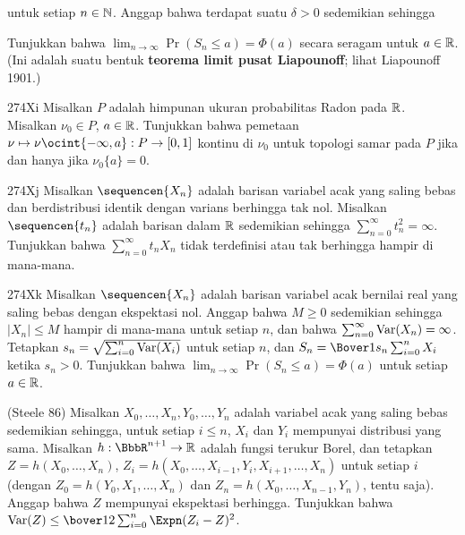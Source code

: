 {

\noindent untuk setiap $n\in\Bbb N$. Anggap bahwa terdapat suatu $\delta>0$
sedemikian sehingga


\noindent Tunjukkan bahwa $\lim_{n\to\infty}\Pr(S_n\le a)=\Phi(a)$ secara
seragam untuk $a\in\Bbb R$. (Ini adalah suatu bentuk {\bf teorema limit pusat
Liapounoff}; lihat {\smc Liapounoff 1901}.)

\spheader 274Xi Misalkan $P$ adalah himpunan ukuran probabilitas Radon pada
$\Bbb R$. Misalkan $\nu_0\in P$, $a\in\Bbb R$. Tunjukkan bahwa pemetaan
$\nu\mapsto\nu\ocint{-\infty,a}:P\to[0,1]$ kontinu di $\nu_0$ untuk
topologi samar pada $P$ jika dan hanya jika $\nu_0\{a\}=0$.

\spheader 274Xj Misalkan $\sequencen{X_n}$ adalah barisan variabel acak
yang saling bebas dan berdistribusi identik dengan varians berhingga tak nol.
Misalkan $\sequencen{t_n}$ adalah barisan dalam $\Bbb R$ sedemikian sehingga
$\sum_{n=0}^{\infty}t_n^2=\infty$. Tunjukkan bahwa
$\sum_{n=0}^{\infty}t_nX_n$ tidak terdefinisi atau tak berhingga hampir di
mana-mana. 

\spheader 274Xk Misalkan $\sequencen{X_n}$ adalah barisan variabel acak
bernilai real yang saling bebas dengan ekspektasi nol. Anggap bahwa $M\ge 0$
sedemikian sehingga $|X_n|\le M$ hampir di mana-mana untuk setiap $n$, dan
bahwa $\sum_{n=0}^{\infty}\mathop{\text{Var}}(X_n)=\infty$. Tetapkan
$s_n=\sqrt{\sum_{i=0}^n\mathop{\text{Var}}(X_i)}$ untuk setiap $n$, dan
$S_n=\Bover1{s_n}\sum_{i=0}^nX_i$ ketika $s_n>0$. Tunjukkan bahwa
$\lim_{n\to\infty}\Pr(S_n\le a)=\Phi(a)$ untuk setiap $a\in\Bbb R$.

({\smc Steele 86})
Misalkan $X_0,\ldots,X_n,Y_0,\ldots,Y_n$ adalah variabel acak yang saling
bebas sedemikian sehingga, untuk setiap $i\le n$,
$X_i$ dan $Y_i$ mempunyai distribusi yang sama.
Misalkan $h:\BbbR^{n+1}\to\Bbb R$ adalah fungsi terukur Borel, dan tetapkan
$Z=h(X_0,\ldots,X_n)$,
$Z_i=h(X_0,\ldots,X_{i-1},Y_i,X_{i+1},\ldots,X_n)$ untuk setiap $i$
(dengan $Z_0=h(Y_0,X_1,\ldots,X_n)$ dan
$Z_n=h(X_0,\ldots,X_{n-1},Y_n)$, tentu saja). Anggap bahwa $Z$ mempunyai
ekspektasi berhingga. Tunjukkan bahwa
$\Var(Z)\le\bover12\sum_{i=0}^n\Expn(Z_i-Z)^2$.

}
